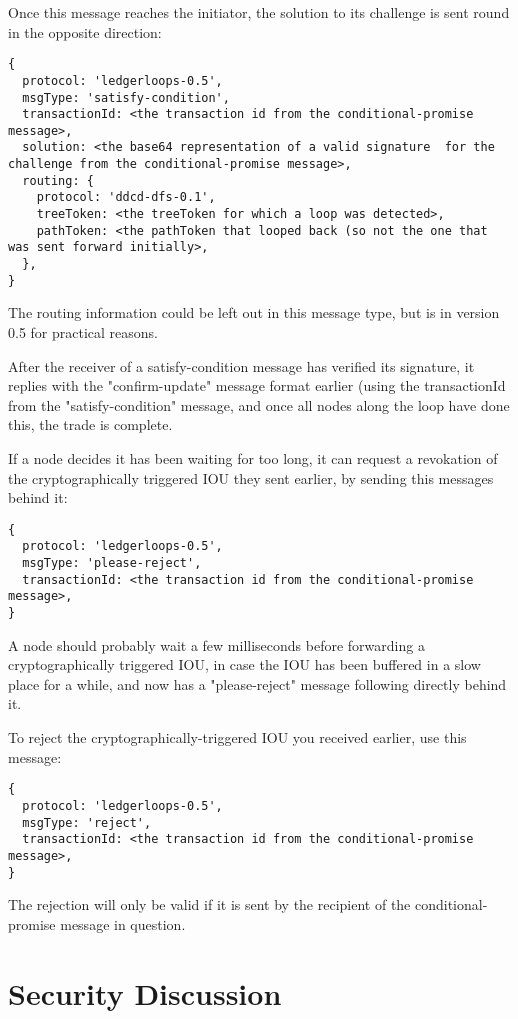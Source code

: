 \documentclass[11pt,twoside,a4paper]{article}
\begin{document}
Once this message reaches the initiator, the solution to its challenge is sent round in the opposite direction:

\begin{lstlisting}
{
  protocol: 'ledgerloops-0.5',
  msgType: 'satisfy-condition',
  transactionId: <the transaction id from the conditional-promise message>,
  solution: <the base64 representation of a valid signature  for the challenge from the conditional-promise message>,
  routing: {
    protocol: 'ddcd-dfs-0.1',
    treeToken: <the treeToken for which a loop was detected>,
    pathToken: <the pathToken that looped back (so not the one that was sent forward initially>,
  },
}
\end{lstlisting}

The routing information could be left out in this message type, but is in version 0.5 for practical reasons.

After the receiver of a satisfy-condition message has verified its signature, it replies with the "confirm-update"
message format earlier (using the transactionId from the "satisfy-condition" message, and once all nodes along the loop
have done this, the trade is complete.

If a node decides it has been waiting for too long, it can request a revokation of the cryptographically triggered IOU they sent earlier,
by sending this messages behind it:

\begin{lstlisting}
{
  protocol: 'ledgerloops-0.5',
  msgType: 'please-reject',
  transactionId: <the transaction id from the conditional-promise message>,
}
\end{lstlisting}

A node should probably wait a few milliseconds before forwarding a cryptographically triggered IOU, in case the IOU has been buffered in
a slow place for a while, and now has a "please-reject" message following directly behind it.

To reject the cryptographically-triggered IOU you received earlier, use this message:

\begin{lstlisting}
{
  protocol: 'ledgerloops-0.5',
  msgType: 'reject',
  transactionId: <the transaction id from the conditional-promise message>,
}
\end{lstlisting}


The rejection will only be valid if it is sent by the recipient of the conditional-promise message in question.

\section{Security Discussion}
\end{document}
